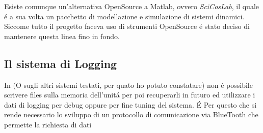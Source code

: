 Esiste comunque un'alternativa OpenSource a Matlab, ovvero \emph{SciCosLab},
il quale \'e a sua volta un pacchetto di modellazione e simulazione di
sistemi dinamici. Siccome tutto il progetto faceva uso
di strumenti OpenSource \'e stato deciso di mantenere questa linea fino in
fondo.

\subsection{Il sistema di Logging}
In \nxtOSEK{} (O sugli altri sistemi testati, per quato ho potuto
constatare) non \'e possibile scrivere files sulla memoria dell'unit\'a per
poi recuperarli in futuro ed utilizzare i dati di logging per debug oppure
per fine tuning del sistema. \'E Per questo che si rende necessario lo
sviluppo di un protocollo di comunicazione via BlueTooth che permette la
richiesta di dati 


